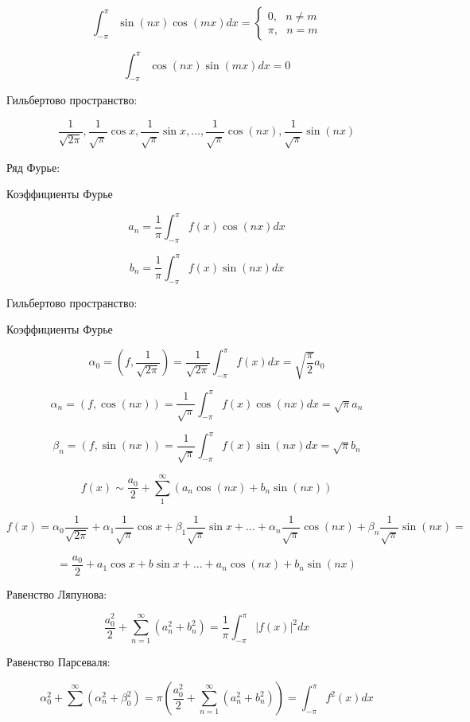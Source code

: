 \documentclass[12pt, a4paper]{report}
\begin{document}
\[ \int_{- \pi }^{\pi } \sin (nx )\cos (mx )dx = \begin{cases}
0 , \text{ } n \neq m \\ 
\pi , \text{ } n = m 
\end{cases}  \] 

\[ \int_{- \pi }^{\pi } \cos (nx ) \sin (mx ) dx = 0  \] 

Гильбертово пространство: 

\[ \frac{1}{\sqrt{2 \pi }} , \frac{1}{\sqrt{\pi } } \cos x , \frac{1}{\sqrt{\pi } } \sin x ,..., \frac{1}{\sqrt{\pi } } \cos(nx) , \frac{1}{\sqrt{\pi } } \sin (nx)      \] 

Ряд Фурье: 

Коэффициенты Фурье

\[ a_n = \frac{1}{\pi} \int_{- \pi }^{\pi}  f(x ) \cos (nx )dx \] 

\[ b_n = \frac{1}{\pi }\int_{- \pi }^{\pi } f(x ) \sin (nx ) dx    \] 

Гильбертово пространство: 

Коэффициенты Фурье

\[ \alpha_0 = \left(  f , \frac{1}{\sqrt{2 \pi } }  \right) = \frac{1}{\sqrt{2 \pi } } \int_{ - \pi }^{\pi } f (x ) dx = \sqrt{\frac{ \pi }{2 } } a_0    \] 

\[ \alpha_n = \left( f ,\cos (nx ) \right) = \frac{1}{\sqrt{\pi } } \int_{- \pi }^{\pi } f(x ) \cos (nx ) dx = \sqrt{\pi } a_n   \] 

\[ \beta_n = (f, \sin (nx )) =  \frac{1}{\sqrt{\pi } } \int_{- \pi }^{\pi } f(x ) \sin (nx ) dx = \sqrt{\pi } b_n   \] 

\[ f(x ) \sim \frac{a_0}{2 }  + \sum_{ 1 } ^{\infty  } ( a_n \cos (nx )+ b_n \sin (nx))  \]  

\[ f(x ) = \alpha_0 \frac{1}{\sqrt{2\pi } } + \alpha_1 \frac{1}{\sqrt{\pi } }\cos x + \beta_1 \frac{1}{\sqrt{\pi } }\sin x + ... + \alpha_n \frac{1}{\sqrt{\pi } } \cos (nx ) + \beta_n \frac{1}{\sqrt{\pi } }\sin (nx ) =      \]  

\[ = \frac{a_0}{2 } + a_1 \cos x + b \sin x + ...+ a_n \cos (nx )+ b_n \sin (nx)  \] 

Равенство Ляпунова: 

\[ \frac{a_0 ^2 }{2} + \sum_{n =1}^{\infty  } (a_n ^2 + b_n ^2 )   = \frac{1}{\pi } \int_{- \pi }^{\pi } |f(x)| ^2 dx  \] 

Равенство Парсеваля: 

\[ \alpha_0 ^2 + \sum ^{\infty  } (\alpha_n ^2 + \beta_0 ^2 ) = \pi \left( \frac{a_0 ^2 }{2 } + \sum_{n =1}^{\infty  }  (a_n ^2 + b_n ^2 ) \right)  = \int_{- \pi }^{\pi } f ^2 ( x ) dx  \] 
\end{document}
